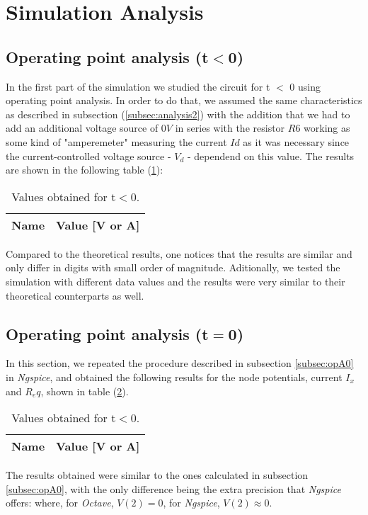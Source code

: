 \section{Simulation Analysis}
\label{sec:simulation}

\subsection{Operating point analysis (t$<$0)}

In the first part of the simulation we studied the circuit for t $<$ 0 using operating point analysis.
In order to do that, we assumed the same characteristics as described in subsection (\ref{subsec:analysis2})
with the addition that we had to add an additional voltage source of $0V$ in series with the resistor $R6$
working as some kind of "amperemeter" measuring the current $I{d}$ as it was necessary
since the current-controlled voltage source - $V_{d}$ - dependend on this value.
The results are shown in the following table (\ref{tab:ngs1}):

\begin{table}[h]
  \centering
  \begin{tabular}{|l|r|}
    \hline
    {\bf Name} & {\bf Value [V or A]} \\ \hline
    
  \end{tabular}
  \caption{Values obtained for t$<$0.}
  \label{tab:ngs1}
\end{table}

Compared to the theoretical results, one notices that the results are similar
and only differ in digits with small order of magnitude. Aditionally, we tested the simulation
with different data values and the results were very similar to their theoretical counterparts as well.

\newpage

\subsection{Operating point analysis (t$=$0)}
In this section, we repeated the procedure described in subsection \ref{subsec:opA0}
 in \emph{Ngspice}, and obtained the following results for the node potentials, current $I_{x}$ and $R_eq$,
 shown in table (\ref{tab:ngs2}).

\begin{table}[h]
  \centering
  \begin{tabular}{|l|r|}
    \hline
    {\bf Name} & {\bf Value [V or A]} \\ \hline
    
  \end{tabular}
  \caption{Values obtained for t$<$0.}
  \label{tab:ngs2}
\end{table}
The results obtained were similar to the ones calculated in subsection \ref{subsec:opA0}, with the only difference
being the extra precision that \emph{Ngspice} offers: where, for \emph{Octave}, $V(2)=0$,
 for \emph{Ngspice}, $V(2)\approx0$.
\newpage

